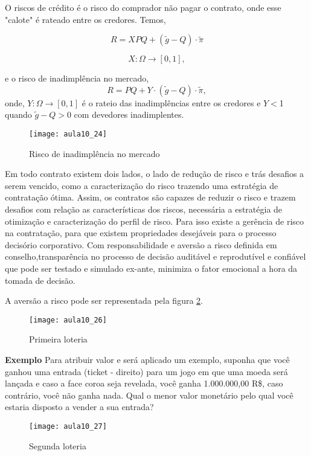  O riscos de crédito é o risco do comprador não pagar o contrato, onde esse "calote" é rateado entre os credores. Temos,

$$R=XPQ+(\tilde{g}-Q)\cdot\tilde{\pi}$$

$$X:\Omega\rightarrow[0,1],$$

e o risco de inadimplência no mercado,
$$
R=PQ+Y\cdot(\tilde{g}-Q)\cdot\tilde{\pi},
$$
onde, $Y:\varOmega\rightarrow[0,1]$ é o rateio das inadimplências entre os credores e $Y<$1 quando $\tilde{g}-Q>0$ com devedores inadimplentes.

\begin{figure}[H]
\begin{centering}
\texttt{[image: aula10\_24]}\protect\caption{\label{fig:aula10_24} Risco de inadimplência no mercado}
\end{centering}
\end{figure}
  Em todo contrato existem dois lados, o lado de redução de risco e trás desafios a serem vencido, como a caracterização do risco trazendo uma estratégia de contratação ótima.
 Assim, os contratos são capazes de reduzir o risco e trazem desafios com relação as características dos riscos, necessária a estratégia de otimização e caracterização do perfil de risco. Para isso existe a gerência de risco na contratação, para que  existem propriedades desejáveis para o processo decisório corporativo. Com responsabilidade e aversão a risco definida em conselho,transparência no processo de decisão auditável e reprodutível e confiável que pode ser testado e simulado ex-ante, minimiza o fator emocional a hora da tomada de decisão.

 A aversão a risco pode ser representada pela figura \ref{fig:aula10_26}.

\begin{figure}[H]
\begin{centering}
\texttt{[image: aula10\_26]}\protect\caption{\label{fig:aula10_26} Primeira loteria}
\end{centering}
\end{figure}

\textbf{Exemplo}
 Para atribuir valor e será aplicado um exemplo, suponha que você ganhou uma entrada (ticket - direito) para um jogo em que uma moeda será lançada e caso a face coroa seja revelada, você ganha 1.000.000,00 R\$, caso contrário, você não ganha nada. Qual o menor valor monetário pelo qual você estaria disposto a vender a sua entrada?
\begin{figure}[H]
\begin{centering}
\texttt{[image: aula10\_27]}\protect\caption{\label{fig:aula10_27} Segunda loteria}
\end{centering}
\end{figure}


